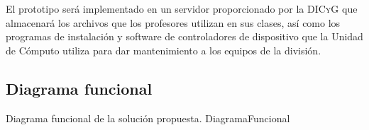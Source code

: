 El prototipo ser\'{a} implementado en un servidor proporcionado por la \textsc{DICyG} que almacenar\'{a} los archivos que los profesores utilizan en sus clases, as\'{i} como los programas de instalaci\'{o}n y software de controladores de dispositivo que la Unidad de C\'{o}mputo utiliza para dar mantenimiento a los equipos de la divisi\'{o}n.

      \subsection {Diagrama funcional}

\diagramblock
{Diagrama funcional de la soluci\'{o}n propuesta.}
{DiagramaFuncional}
